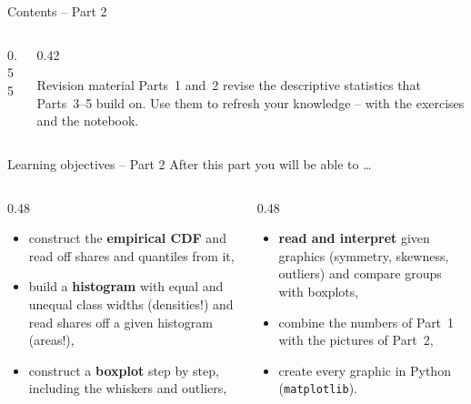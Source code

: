 \documentclass[aspectratio=169,11pt]{beamer}
\subtitle{Part 2: Graphical Representations -- Revision Material}
\begin{document}
\frame{\titlepage}

\aboutlecturer

\courseoverview

\begin{frame}{Contents -- Part 2}
  \begin{columns}[c]
    \begin{column}{0.55\textwidth}
      \tableofcontents[hideallsubsections]
    \end{column}
    \begin{column}{0.42\textwidth}
      \begin{alertblock}{Revision material}
        Parts~1 and~2 revise the descriptive statistics that Parts~3--5
        build on. Use them to refresh your knowledge -- with the exercises
        and the notebook.
      \end{alertblock}
    \end{column}
  \end{columns}
\end{frame}

\begin{frame}{Learning objectives -- Part 2}
  After this part you will be able to \ldots
  \begin{columns}[T]
    \begin{column}{0.48\textwidth}
      \begin{itemize}\setlength{\itemsep}{3pt}
        \item construct the \textbf{empirical CDF} and read off shares
              and quantiles from it,
        \item build a \textbf{histogram} with equal and unequal class
              widths (densities!) and read shares off a given
              histogram (areas!),
        \item construct a \textbf{boxplot} step by step, including the
              whiskers and outliers,
      \end{itemize}
    \end{column}
    \begin{column}{0.48\textwidth}
      \begin{itemize}\setlength{\itemsep}{3pt}
        \item \textbf{read and interpret} given graphics (symmetry,
              skewness, outliers) and compare groups with boxplots,
        \item combine the numbers of Part~1 with the pictures of Part~2,
        \item create every graphic in Python (\texttt{matplotlib}).
      \end{itemize}
    \end{column}
  \end{columns}
\end{frame}
\end{document}
